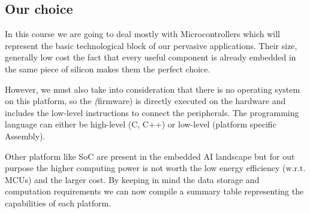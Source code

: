 \documentclass{article}
\begin{document}
    \newpage

    \subsection{Our choice}
      In this course we are going to deal mostly with Microcontrollers which will represent the basic technological block of our pervasive
      applications. Their size, generally low cost the fact that every useful component is already embedded in the same piece of silicon makes them the perfect choice.

      However, we must also take into consideration that there is no operating system on this platform, so the \emph(firmware) is directly executed on the hardware and 
      includes the low-level instructions to connect the peripherals. The programming language can either be high-level (C, C++) or low-level (platform specific Assembly).

      Other platform like SoC are present in the embedded AI landscape but for out purpose the higher computing power is not worth the low energy efficiency (w.r.t. MCUs) and the larger cost.
      By keeping in mind the data storage and computation requirements we can now compile a summary table representing the capabilities of each platform.
\end{document}
